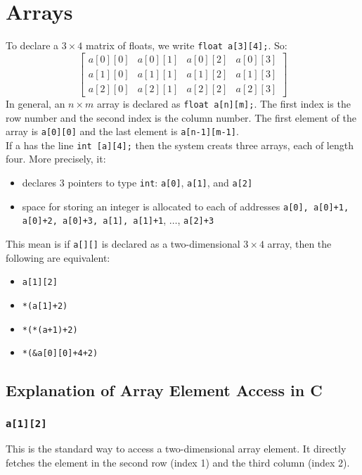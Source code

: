 \documentclass[a4paper, 10pt]{article}
\begin{document}
\section{Arrays}
To declare a $3 \times 4$ matrix of floats, we write \texttt{float a[3][4];}. So:
$$\begin{bmatrix}
        a[0][0] & a[0][1] & a[0][2] & a[0][3] \\
        a[1][0] & a[1][1] & a[1][2] & a[1][3] \\
        a[2][0] & a[2][1] & a[2][2] & a[2][3]
    \end{bmatrix}
$$
In general, an $n \times m$ array is declared as \texttt{float a[n][m];}. The first index is the row number and the second index is the column number. The first element of the array is \texttt{a[0][0]} and the last element is \texttt{a[n-1][m-1]}. \\[2ex]
If a has the line \texttt{int [a][4];} then the system creats three arrays, each of length four. More precisely, it:
\begin{itemize}
    \item declares 3 pointers to type \texttt{int}: \texttt{a[0]}, \texttt{a[1]}, and \texttt{a[2]}
    \item space for storing an integer is allocated to each of addresses \texttt{a[0], a[0]+1, a[0]+2, a[0]+3, a[1], a[1]+1}, $\dots$, \texttt{a[2]+3}
\end{itemize}
This mean is if \texttt{a[][]} is declared as a two-dimensional $3 \times 4$ array, then the following are equivalent:
\begin{itemize}
    \item \texttt{a[1][2]}
    \item \texttt{*(a[1]+2)}
    \item \texttt{*(*(a+1)+2)}
    \item \texttt{*(\&a[0][0]+4+2)}
\end{itemize}
\subsection{Explanation of Array Element Access in C}

\subsubsection*{\texttt{a[1][2]}}
This is the standard way to access a two-dimensional array element. It directly fetches the element in the second row (index 1) and the third column (index 2).
\end{document}
